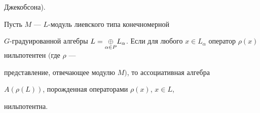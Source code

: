 Джекобсона). 


 


\begin{thm} 


Пусть $M$ --- $L$-модуль лиевского типа конечномерной 


$G$-градуированной алгебры $L=\aplus L_\alpha$. Если для любого $x\in 


L_\alpha$ оператор $\rho(x)$ нильпотентен $($где $\rho$ --- 


представление, отвечающее модулю $M)$, то ассоциативная алгебра 


$A(\rho(L))$, порожденная операторами $\rho(x)$, $x\in L$, 


нильпотентна. 


\end{thm} 


 



